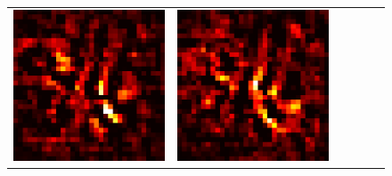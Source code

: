 \documentclass[preprint,12pt]{elsarticle}
\begin{document}
\begin{figure}[p]
\begin{tabular}{cccccc}
  \includegraphics[scale=\scale]{../visualizations/examples/cifar10/cnn/positive_saliency_map/6.png} & 
  \includegraphics[scale=\scale]{../visualizations/examples/cifar10/cnn/negative_saliency_map/6.png} & 

\end{tabular}
\end{figure}
\end{document}
